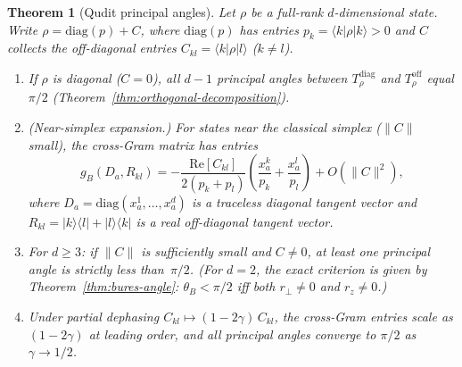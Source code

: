 \documentclass[12pt,a4paper]{article}
\newtheorem{theorem}{Theorem}[section]
\theoremstyle{definition}
\theoremstyle{remark}
\begin{document}
\begin{theorem}[Qudit principal angles]
\label{thm:qudit-angles}
Let $\rho$ be a full-rank $d$-dimensional state.  Write $\rho = \mathrm{diag}(p) + C$, where $\mathrm{diag}(p)$ has entries $p_k = \langle k|\rho|k\rangle > 0$ and $C$ collects the off-diagonal entries $C_{kl} = \langle k|\rho|l\rangle$ ($k \neq l$).
\begin{enumerate}
\item[\emph{(i)}] If $\rho$ is diagonal ($C = 0$), all $d - 1$ principal angles between $T_\rho^{\mathrm{diag}}$ and $T_\rho^{\mathrm{off}}$ equal $\pi/2$ \emph{(Theorem~\ref{thm:orthogonal-decomposition})}.
\item[\emph{(ii)}] \emph{(Near-simplex expansion.)} For states near the classical simplex ($\lVert C \rVert$ small), the cross-Gram matrix has entries
\begin{equation}
\label{eq:cross-gram}
g_B(D_a, R_{kl}) = -\frac{\mathrm{Re}[C_{kl}]}{2(p_k + p_l)}\!\left(\frac{x_a^k}{p_k} + \frac{x_a^l}{p_l}\right) + O(\lVert C \rVert^2),
\end{equation}
where $D_a = \mathrm{diag}(x_a^1, \ldots, x_a^d)$ is a traceless diagonal tangent vector and $R_{kl} = |k\rangle\langle l| + |l\rangle\langle k|$ is a real off-diagonal tangent vector.
\item[\emph{(iii)}] For $d \geq 3$: if $\lVert C \rVert$ is sufficiently small and $C \neq 0$, at least one principal angle is strictly less than~$\pi/2$.  (For $d = 2$, the exact criterion is given by Theorem~\ref{thm:bures-angle}: $\theta_B < \pi/2$ iff both $r_\perp \neq 0$ and $r_z \neq 0$.)
\item[\emph{(iv)}] Under partial dephasing $C_{kl} \mapsto (1-2\gamma)\, C_{kl}$, the cross-Gram entries scale as $(1-2\gamma)$ at leading order, and all principal angles converge to $\pi/2$ as $\gamma \to 1/2$.
\end{enumerate}
\end{theorem}
\end{document}

